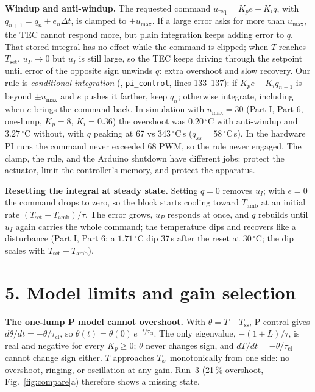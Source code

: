 \documentclass[reprint, amsmath, amssymb, aps, floatfix]{revtex4-2}
\newcommand{\degC}{\,^\circ\mathrm{C}}
\newcommand{\Tset}{T_{\mathrm{set}}}
\newcommand{\Tamb}{T_{\mathrm{amb}}}
\newcommand{\Tss}{T_{\mathrm{ss}}}
\begin{document}
\textbf{Windup and anti-windup.} The requested command
$u_{\mathrm{req}} = K_pe + K_iq$, with $q_{n+1} = q_n + e_n\Delta t$, is clamped to
$\pm u_{\max}$. If a large error asks for more than $u_{\max}$, the TEC cannot respond more,
but plain integration keeps adding error to $q$. That stored integral has no effect while
the command is clipped; when $T$ reaches $\Tset$, $u_P \to 0$ but $u_I$ is still large, so
the TEC keeps driving through the setpoint until error of the opposite sign unwinds $q$:
extra overshoot and slow recovery. Our rule is \emph{conditional integration}
(, \texttt{pi\_control}, lines 133--137): if
$K_pe + K_iq_{n+1}$ is beyond $\pm u_{\max}$ and $e$ pushes it farther, keep $q_n$;
otherwise integrate, including when $e$ brings the command back. In simulation with
$u_{\max} = 30$ (Part I, Part 6, one-lump, $K_p = 8$, $K_i = 0.36$) the overshoot was
$0.20\degC$ with anti-windup and $3.27\degC$ without, with $q$ peaking at 67 vs 343$\degC$\,s
($q_{ss} = 58\degC$\,s). In the hardware PI runs the command never exceeded 68 PWM, so the
rule never engaged. The clamp, the rule, and the Arduino shutdown have different jobs:
protect the actuator, limit the controller's memory, and protect the apparatus.

\textbf{Resetting the integral at steady state.} Setting $q = 0$ removes $u_I$; with
$e = 0$ the command drops to zero, so the block starts cooling toward $\Tamb$ at an initial
rate $(\Tset - \Tamb)/\tau$. The error grows, $u_P$ responds at once, and $q$ rebuilds until
$u_I$ again carries the whole command; the temperature dips and recovers like a
disturbance (Part I, Part 6: a $1.71\degC$ dip 37\,s after the reset at $30\degC$; the dip
scales with $\Tset - \Tamb$).

\section*{5. Model limits and gain selection}

\textbf{The one-lump P model cannot overshoot.} With $\theta = T - \Tss$, P control gives
$d\theta/dt = -\theta/\tau_{\mathrm{cl}}$, so $\theta(t) = \theta(0)\,e^{-t/\tau_{\mathrm{cl}}}$.
The only eigenvalue, $-(1+L)/\tau$, is real and negative for every $K_p \ge 0$; $\theta$
never changes sign, and $dT/dt = -\theta/\tau_{\mathrm{cl}}$ cannot change sign either. $T$
approaches $\Tss$ monotonically from one side: no overshoot, ringing, or oscillation at any
gain. Run~3 (21\,\% overshoot, Fig.~\ref{fig:compare}a) therefore shows a missing state.
\end{document}
